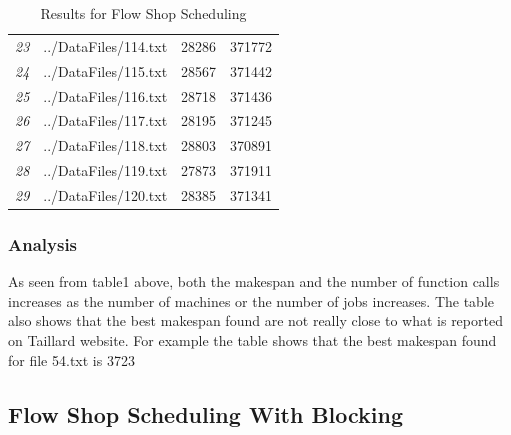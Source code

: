 \documentclass[12pt]{article}
\begin{document}
\begin{table}[ht]
{\begin{tabular}{rlrr}
								{\textit{23}} & ../DataFiles/114.txt & 28286 & 371772 \\ 
								{\textit{24}} & ../DataFiles/115.txt & 28567 & 371442 \\ 
								{\textit{25}} & ../DataFiles/116.txt & 28718 & 371436 \\ 
								{\textit{26}} & ../DataFiles/117.txt & 28195 & 371245 \\ 
								{\textit{27}} & ../DataFiles/118.txt & 28803 & 370891 \\ 
								{\textit{28}} & ../DataFiles/119.txt & 27873 & 371911 \\ 
								{\textit{29}} & ../DataFiles/120.txt & 28385 & 371341 \\ 
								\hline
							\end{tabular}
						
						}
					\caption{Results for Flow Shop Scheduling}
				\end{table}
			
				\subsubsection{Analysis}
					As seen from table1 above, both the makespan and the number of function calls increases as the number of machines or the number of jobs increases. The table also shows that the best makespan found are not really close to what is reported on Taillard website. For example the table shows that the best makespan found for file 54.txt is 3723
			
			
				\subsection{Flow Shop Scheduling With Blocking}
\end{document}
